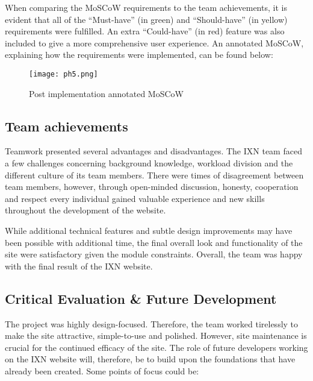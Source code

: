 \documentclass[fontsize=11pt]{extarticle}
\numberwithin{figure}{section} %
\begin{document}
When comparing the MoSCoW requirements to the team achievements, it is
evident that all of the ``Must-have'' (in green) and ``Should-have'' (in
yellow) requirements were fulfilled. An extra ``Could-have'' (in red)
feature was also included to give a more comprehensive user experience.
An annotated MoSCoW, explaining how the requirements were implemented,
can be found below:

\begin{figure}[H]
      \centering
      \texttt{[image: ph5.png]}
      \caption{Post implementation annotated MoSCoW}
 \end{figure}

\hypertarget{team-achievements}{%
\subsection{Team achievements}\label{team-achievements}}

Teamwork presented several advantages and disadvantages. The IXN team
faced a few challenges concerning background knowledge, workload
division and the different culture of its team members. There were times
of disagreement between team members, however, through open-minded
discussion, honesty, cooperation and respect every individual gained
valuable experience and new skills throughout the development of the
website.

While additional technical features and subtle design improvements may
have been possible with additional time, the final overall look and
functionality of the site were satisfactory given the module
constraints. Overall, the team was happy with the final result of the
IXN website.

\hypertarget{critical-evaluation-future-development}{%
\subsection{Critical Evaluation \& Future
Development}\label{critical-evaluation-future-development}}

The project was highly design-focused. Therefore, the team worked
tirelessly to make the site attractive, simple-to-use and polished.
However, site maintenance is crucial for the continued efficacy of the
site.\cite{g8} The role of future developers working on the IXN website
will, therefore, be to build upon the foundations that have already been
created. Some points of focus could be:
\end{document}

